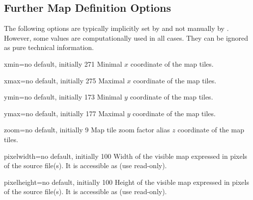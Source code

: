 \subsection{Further Map Definition Options}


The following options are typically implicitly set by 
and not manually by . However, some values are
computationally used in all cases. They can be ignored as pure technical
information.

\begin{docMrcKey}[mapdef]{xmin}{=}{no default, initially 271}
  Minimal $x$ coordinate of the map tiles.
\end{docMrcKey}

\begin{docMrcKey}[mapdef]{xmax}{=}{no default, initially 275}
  Maximal $x$ coordinate of the map tiles.
\end{docMrcKey}

\begin{docMrcKey}[mapdef]{ymin}{=}{no default, initially 173}
  Minimal $y$ coordinate of the map tiles.
\end{docMrcKey}

\begin{docMrcKey}[mapdef]{ymax}{=}{no default, initially 177}
  Maximal $y$ coordinate of the map tiles.
\end{docMrcKey}

\begin{docMrcKey}[mapdef]{zoom}{=}{no default, initially 9}
  Map tile zoom factor alias $z$ coordinate of the map tiles.
\end{docMrcKey}

\begin{docMrcKey}[mapdef]{pixelwidth}{=}{no default, initially 100}
  Width of the visible map expressed in pixels of the source file(s).
  It is accessible as  (use read-only).
\end{docMrcKey}

\begin{docMrcKey}[mapdef]{pixelheight}{=}{no default, initially 100}
  Height of the visible map expressed in pixels of the source file(s).
  It is accessible as  (use read-only).
\end{docMrcKey}

